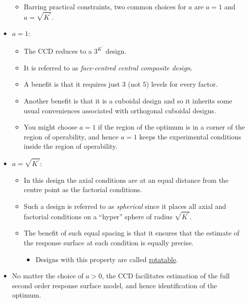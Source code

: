 \begin{itemize}
\begin{itemize}
              \item Barring practical constraints, two common choices for $ a $ are $ a=1 $ and $ a=\sqrt{K^\prime} $.
          \end{itemize}
    \item $ a=1 $:
          \begin{itemize}
              \item The CCD reduces to a $ 3^{K^\prime} $ design.
              \item It is referred to as \emph{face-centred central composite design}.
              \item A benefit is that it requires just 3 (not 5) levels for every factor.
              \item Another benefit is that it is a cuboidal design and so it inherits some usual conveniences
                    associated with orthogonal cuboidal designs.
              \item You might choose $ a=1 $ if the region of the optimum is in a corner of the region of operability, and hence $ a=1 $ keeps the experimental conditions inside the
                    region of operability.
          \end{itemize}
    \item $ a=\sqrt{K^\prime} $:
          \begin{itemize}
              \item In this design the axial conditions are at an equal distance from the centre point as the factorial
                    conditions.
              \item Such a design is referred to as \emph{spherical} since it places all axial and factorial conditions on a ``hyper'' sphere of radius $ \sqrt{K^\prime} $.
              \item The benefit of such equal spacing is that it ensures that the estimate of the response surface at each condition is equally precise.
                    \begin{itemize}[$\hookrightarrow$]
                        \item Designs with this property are called \underline{rotatable}.
                    \end{itemize}
          \end{itemize}
    \item No matter the choice of $ a>0 $, the CCD facilitates estimation of the full second order response surface
          model, and hence identification of the optimum.
\end{itemize}
